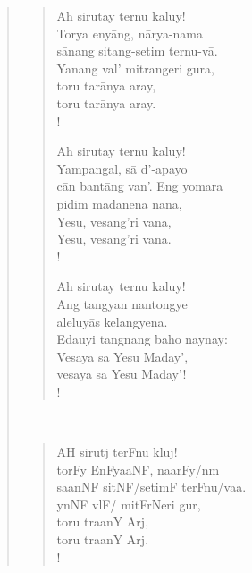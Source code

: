 \documentclass[12pt,paper=a4]{scrartcl}
\begin{document}
\begin{quote}
\begin{minipage}[t]{.5\linewidth}
\begin{verse}
\renewcommand*{\vrightskip}{-2em}
\verselinenumbersleft
{}
\begin{patverse}
Ah sirutay ternu kaluy!\\
Torya enyāng, nārya-nama\\
sānang sitang-setim ternu-vā.\\
Yanang val' mitrangeri gura,\\
toru tarānya aray,\\
toru tarānya aray.\\!
\end{patverse}

\begin{patverse}
Ah sirutay ternu kaluy!\\
Yampangal, sā d'-apayo\\
cān bantāng van'. Eng yomara\\
pidim madānena nana,\\
Yesu, vesang'ri vana,\\
Yesu, vesang'ri vana.\\!
\end{patverse}

\begin{patverse}
Ah sirutay ternu kaluy!\\
Ang tangyan nantongye\\
aleluyās kelangyena.\\
Edauyi tangnang baho naynay:\\
Vesaya sa Yesu Maday',\\
vesaya sa Yesu Maday'!\\!
\end{patverse}
\end{verse}
\end{minipage}
~
\begin{minipage}[t]{.5\linewidth}
\Tagati %
\begin{verse}
\begin{patverse}
AH sirutj terFnu kluj!\\
torFy EnFyaaNF, naarFy/nm\\
saanNF sitNF/setimF terFnu/vaa.\\
ynNF vlF/ mitFrNeri gur,\\
toru traanY Arj,\\
toru traanY Arj.\\!
\end{patverse}


\end{verse}
\end{minipage}
\end{quote}
\end{document}
